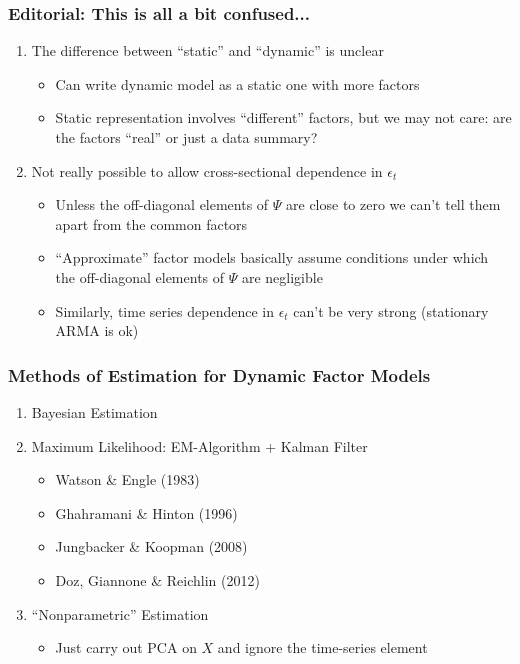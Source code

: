 \documentclass[handout]{beamer}
\begin{document}
\begin{frame}
	\frametitle{Editorial: This is all a bit confused...}

\begin{enumerate}
	\item The difference between ``static'' and ``dynamic'' is unclear \begin{itemize}
		\item Can write dynamic model as a static one with more factors
		\item Static representation involves ``different'' factors, but we may not care: are the factors ``real'' or just a data summary?
	\end{itemize} 
	\item Not really possible to allow cross-sectional dependence in $\epsilon_t$ \begin{itemize}
		\item Unless the off-diagonal elements of $\Psi$ are close to zero we can't tell them apart from the common factors
		\item ``Approximate'' factor models basically assume conditions under which the off-diagonal elements of $\Psi$ are negligible
		\item Similarly, time series dependence in $\epsilon_t$ can't be very strong (stationary ARMA is ok)
	\end{itemize}
\end{enumerate}

\end{frame}
\begin{frame}
	\frametitle{Methods of Estimation for Dynamic Factor Models}

	\begin{enumerate}
		\item Bayesian Estimation
		\item Maximum Likelihood: EM-Algorithm + Kalman Filter \begin{itemize}
			\item Watson \& Engle (1983)
			\item Ghahramani \& Hinton (1996)
			\item Jungbacker \& Koopman (2008)
			\item Doz, Giannone \& Reichlin (2012)
		\end{itemize}
		\item ``Nonparametric'' Estimation
			\begin{itemize}
				\item Just carry out PCA on $X$ and ignore the time-series element
			\end{itemize}
	\end{enumerate}
\end{frame}
\end{document}
